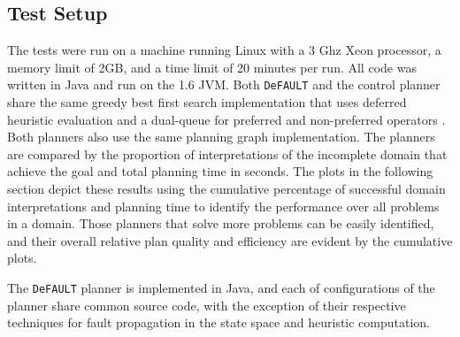\documentclass{article}
\def\citep#1{\cite{#1}}
\def\und#1{\noindent{\bf #1}:}
\def\FFRISKY{{\tt DeFAULT}}
\def\und#1{\medskip{\noindent\bf #1:}}
\begin{document}
%
%
%
%
%
\subsection{Test Setup} The tests were run on a machine running Linux with a 3 Ghz Xeon processor, a memory limit of 2GB, and a time limit of 20 minutes per run.  All code was written in Java and run on the 1.6 JVM.  Both \FFRISKY{} and the control planner share the same greedy best first search implementation that uses deferred heuristic evaluation and a dual-queue for preferred and non-preferred operators \citep{DBLP:journals/jair/Helmert06}.  Both planners also use the same planning graph implementation.  
The planners are compared by the proportion of interpretations of the incomplete domain that achieve the goal and total planning time in seconds.  
The plots in the following section depict these results using the cumulative percentage of successful domain interpretations and planning time to identify the performance over all problems in a domain.  Those planners that solve more problems can be easily identified, and their overall relative plan quality and efficiency are evident by the cumulative plots.

\und{\FFRISKY{} Implementation}The \FFRISKY{} planner is implemented in Java, and each of configurations of the planner share common source code, with the exception of their respective techniques for fault propagation in the state space and heuristic computation.  
\end{document}
